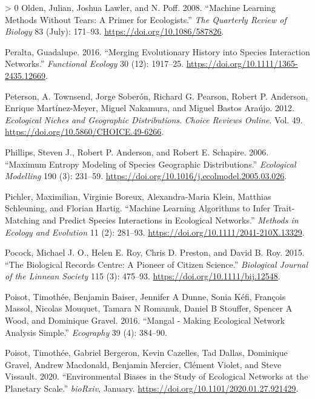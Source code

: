 \documentclass[11pt]{article}
\newlength{\cslhangindent}
\newenvironment{CSLReferences}[3] %
 {%
  \setlength{\parindent}{0pt}
  \ifodd #1 \everypar{\setlength{\hangindent}{\cslhangindent}}\ignorespaces\fi
  \ifnum #2 > 0
  \setlength{\parskip}{#2\baselineskip}
  \fi
 }%
 {}
\begin{document}
\begin{CSLReferences}{1}{0}
\leavevmode\hypertarget{ref-Olden2008MacLea}{}%
Olden, Julian, Joshua Lawler, and N. Poff. 2008. {``Machine Learning
Methods Without Tears: A Primer for Ecologists.''} \emph{The Quarterly
Review of Biology} 83 (July): 171--93.
\url{https://doi.org/10.1086/587826}.

\leavevmode\hypertarget{ref-Peralta2016MerEvo}{}%
Peralta, Guadalupe. 2016. {``Merging Evolutionary History into Species
Interaction Networks.''} \emph{Functional Ecology} 30 (12): 1917--25.
\url{https://doi.org/10.1111/1365-2435.12669}.

\leavevmode\hypertarget{ref-Peterson2012EcoNic}{}%
Peterson, A. Townsend, Jorge Soberón, Richard G. Pearson, Robert P.
Anderson, Enrique Martínez-Meyer, Miguel Nakamura, and Miguel Bastos
Araújo. 2012. \emph{Ecological Niches and Geographic Distributions}.
\emph{Choice Reviews Online}. Vol. 49.
\url{https://doi.org/10.5860/CHOICE.49-6266}.

\leavevmode\hypertarget{ref-Phillips2006MaxEnt}{}%
Phillips, Steven J., Robert P. Anderson, and Robert E. Schapire. 2006.
{``Maximum Entropy Modeling of Species Geographic Distributions.''}
\emph{Ecological Modelling} 190 (3): 231--59.
\url{https://doi.org/10.1016/j.ecolmodel.2005.03.026}.

\leavevmode\hypertarget{ref-Pichler2019MacLea}{}%
Pichler, Maximilian, Virginie Boreux, Alexandra-Maria Klein, Matthias
Schleuning, and Florian Hartig. {``Machine Learning Algorithms to Infer
Trait-Matching and Predict Species Interactions in Ecological
Networks.''} \emph{Methods in Ecology and Evolution} 11 (2): 281--93.
\url{https://doi.org/10.1111/2041-210X.13329}.

\leavevmode\hypertarget{ref-Pocock2015BioRec}{}%
Pocock, Michael J. O., Helen E. Roy, Chris D. Preston, and David B. Roy.
2015. {``The Biological Records Centre: A Pioneer of Citizen Science.''}
\emph{Biological Journal of the Linnean Society} 115 (3): 475--93.
\url{https://doi.org/10.1111/bij.12548}.

\leavevmode\hypertarget{ref-Poisot2016ManMak}{}%
Poisot, Timothée, Benjamin Baiser, Jennifer A Dunne, Sonia Kéfi,
François Massol, Nicolas Mouquet, Tamara N Romanuk, Daniel B Stouffer,
Spencer A Wood, and Dominique Gravel. 2016. {``Mangal - Making
Ecological Network Analysis Simple.''} \emph{Ecography} 39 (4): 384--90.

\leavevmode\hypertarget{ref-Poisot2020EnvBia}{}%
Poisot, Timothée, Gabriel Bergeron, Kevin Cazelles, Tad Dallas,
Dominique Gravel, Andrew Macdonald, Benjamin Mercier, Clément Violet,
and Steve Vissault. 2020. {``Environmental Biases in the Study of
Ecological Networks at the Planetary Scale.''} \emph{bioRxiv}, January.
\url{https://doi.org/10.1101/2020.01.27.921429}.


\end{CSLReferences}
\end{document}
